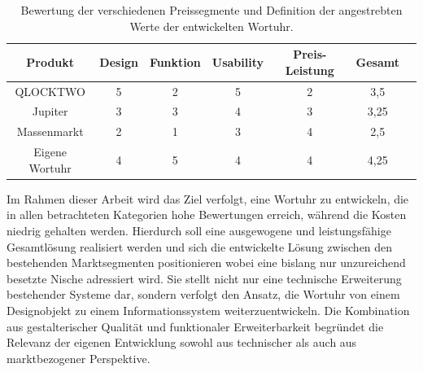 \begin{table}[h]
\centering
\begin{tabular}{|c|c|c|c|c|c|c|}
\hline
\textbf{Produkt} & \textbf{Design} & \textbf{Funktion} & \textbf{Usability} & \textbf{Preis-Leistung} & \textbf{Gesamt} \\
\hline
QLOCKTWO & 5 & 2 & 5 & 2 & 3,5 \\
\hline
Jupiter & 3 & 3 & 4 & 3 & 3,25 \\
\hline
Massenmarkt & 2 & 1 & 3 & 4 & 2,5 \\
\hline
Eigene Wortuhr & 4 & 5 & 4 & 4 & 4,25 \\
\hline
\end{tabular}
\caption{Bewertung der verschiedenen Preissegmente und Definition der angestrebten Werte der entwickelten Wortuhr.}
\label{tab:bewertung_wordclock}
\end{table}

Im Rahmen dieser Arbeit wird das Ziel verfolgt, eine Wortuhr zu entwickeln, die in allen betrachteten Kategorien hohe Bewertungen erreich, während die Kosten niedrig gehalten werden. 
Hierdurch soll eine ausgewogene und leistungsfähige Gesamtlösung realisiert werden und sich die entwickelte Lösung zwischen den bestehenden Marktsegmenten positionieren wobei eine bislang nur unzureichend besetzte Nische adressiert wird. 
Sie stellt nicht nur eine technische Erweiterung bestehender Systeme dar, sondern verfolgt den Ansatz, die Wortuhr von einem Designobjekt zu einem Informationssystem weiterzuentwickeln. 
Die Kombination aus gestalterischer Qualität und funktionaler Erweiterbarkeit begründet die Relevanz der eigenen Entwicklung sowohl aus technischer als auch aus marktbezogener Perspektive.